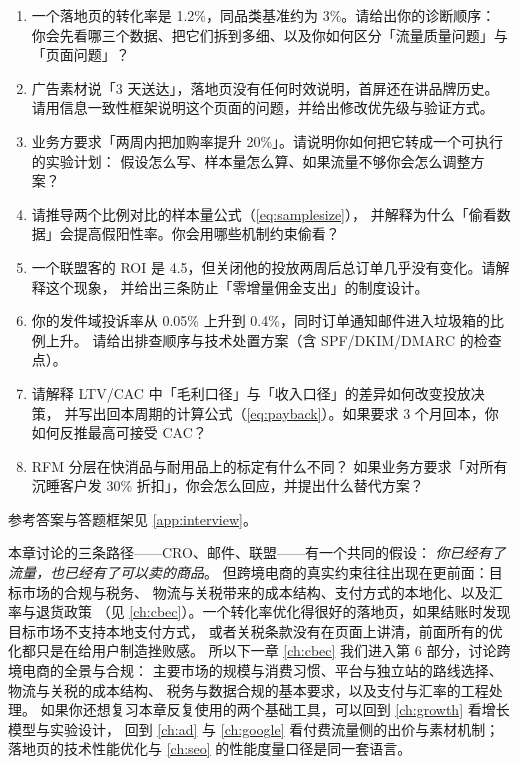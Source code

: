 \begin{interview}[本章对应的面试题]
\begin{enumerate}
  \item 一个落地页的转化率是 1.2\%，同品类基准约为 3\%。请给出你的诊断顺序：
        你会先看哪三个数据、把它们拆到多细、以及你如何区分「流量质量问题」与「页面问题」？
  \item 广告素材说「3 天送达」，落地页没有任何时效说明，首屏还在讲品牌历史。
        请用信息一致性框架说明这个页面的问题，并给出修改优先级与验证方式。
  \item 业务方要求「两周内把加购率提升 20\%」。请说明你如何把它转成一个可执行的实验计划：
        假设怎么写、样本量怎么算、如果流量不够你会怎么调整方案？
  \item 请推导两个比例对比的样本量公式（\cref{eq:samplesize}），
        并解释为什么「偷看数据」会提高假阳性率。你会用哪些机制约束偷看？
  \item 一个联盟客的 ROI 是 4.5，但关闭他的投放两周后总订单几乎没有变化。请解释这个现象，
        并给出三条防止「零增量佣金支出」的制度设计。
  \item 你的发件域投诉率从 0.05\% 上升到 0.4\%，同时订单通知邮件进入垃圾箱的比例上升。
        请给出排查顺序与技术处置方案（含 SPF/DKIM/DMARC 的检查点）。
  \item 请解释 LTV/CAC 中「毛利口径」与「收入口径」的差异如何改变投放决策，
        并写出回本周期的计算公式（\cref{eq:payback}）。如果要求 3 个月回本，你如何反推最高可接受 CAC？
  \item RFM 分层在快消品与耐用品上的标定有什么不同？
        如果业务方要求「对所有沉睡客户发 30\% 折扣」，你会怎么回应，并提出什么替代方案？
\end{enumerate}
参考答案与答题框架见 \cref{app:interview}。
\end{interview}

本章讨论的三条路径——CRO、邮件、联盟——有一个共同的假设：
\emph{你已经有了流量，也已经有了可以卖的商品}。
但跨境电商的真实约束往往出现在更前面：目标市场的合规与税务、
物流与关税带来的成本结构、支付方式的本地化、以及汇率与退货政策
（见 \cref{ch:cbec}）。一个转化率优化得很好的落地页，如果结账时发现目标市场不支持本地支付方式，
或者关税条款没有在页面上讲清，前面所有的优化都只是在给用户制造挫败感。
所以下一章 \cref{ch:cbec} 我们进入第 6 部分，讨论跨境电商的全景与合规：
主要市场的规模与消费习惯、平台与独立站的路线选择、物流与关税的成本结构、
税务与数据合规的基本要求，以及支付与汇率的工程处理。
如果你还想复习本章反复使用的两个基础工具，可以回到 \cref{ch:growth} 看增长模型与实验设计，
回到 \cref{ch:ad} 与 \cref{ch:google} 看付费流量侧的出价与素材机制；
落地页的技术性能优化与 \cref{ch:seo} 的性能度量口径是同一套语言。
